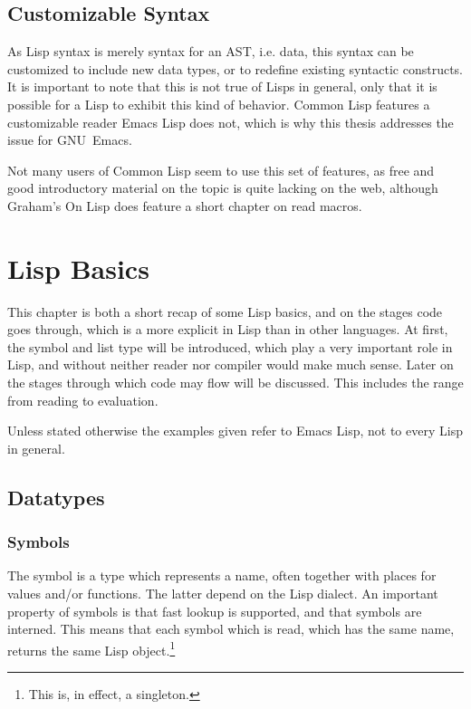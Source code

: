 \documentclass[a4paper,10pt,twoside]{report}
\newcommand{\el}{Emacs Lisp}
\newcommand{\cl}{Common Lisp}
\newcommand{\emacs}{GNU~Emacs}
\begin{document}
\section{Customizable Syntax}
\label{subsec:custom-syntax}

As Lisp syntax is merely syntax for an AST, i.e. data, this syntax can be
customized to include new data types, or to redefine existing syntactic
constructs.  It is important to note that this is not true of Lisps in general,
only that it is possible for a Lisp to exhibit this kind of behavior.  \cl{}
features a customizable reader \el{} does not, which is why this thesis
addresses the issue for \emacs{}.

Not many users of \cl{} seem to use this set of features, as free and good
introductory material on the topic is quite lacking on the web, although
Graham’s On Lisp \cite{on-lisp} does feature a short chapter on read
macros.

\chapter{Lisp Basics}
\label{chapter:lisp-basics}

This chapter is both a short recap of some Lisp basics, and on the stages code
goes through, which is a more explicit in Lisp than in other languages.  At
first, the symbol and list type will be introduced, which play a very important
role in Lisp, and without neither reader nor compiler would make much sense.
Later on the stages through which code may flow will be discussed.  This
includes the range from reading to evaluation.

Unless stated otherwise the examples given refer to \el{}, not to every Lisp in
general.

\section{Datatypes}
\label{sec:datatypes}

\subsection{Symbols}
\label{subsubsec:symbols}

The symbol is a type which represents a name, often together with places for
values and/or functions.  The latter depend on the Lisp dialect.  An important
property of symbols is that fast lookup is supported, and that symbols are
interned.  This means that each symbol which is read, which has the same name,
returns the same Lisp object.\footnote{This is, in effect, a singleton.}
\end{document}
